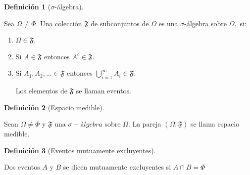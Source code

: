 \documentclass[
  us-letterpaper,
]{scrreprt}
\theoremstyle{definition}
\newtheorem{definition}{Definición}[chapter]
\theoremstyle{plain}
\theoremstyle{plain}
\theoremstyle{remark}
\begin{document}
\begin{definition}[\(\sigma\)-álgebra]\protect\hypertarget{def-sigma_algebra}{}\label{def-sigma_algebra}

Sea \(\Omega \neq \Phi\). Una colección \(\mathfrak{F}\) de subconjuntos
de \(\Omega\) es una \(\sigma\)-álgebra sobre \(\Omega,\) si:

\begin{enumerate}
\def\labelenumi{\roman{enumi}.}
\item
  \(\Omega \in  \mathfrak{F}\).
\item
  Si \(A \in \mathfrak{F}\) entonces \(A^c \in \mathfrak{F}\).
\item
  Si \(A_1, A_2, ... \in \mathfrak{F}\) entonces
  \(\bigcup_{i=1}^{\infty} A_i \in \mathfrak{F}\).

  Los elementos de \(\mathfrak{F}\) se llaman eventos.
\end{enumerate}

\end{definition}

\begin{definition}[Espacio
medible]\protect\hypertarget{def-espacio_medible}{}\label{def-espacio_medible}

Sean \(\Omega \neq \Phi\) y \(\mathfrak{F}\) una \(\sigma- álgebra\)
sobre \(\Omega\). La pareja \((\Omega, \mathfrak{F})\) se llama espacio
medible.

\end{definition}

\begin{definition}[Eventos mutuamente
excluyentes]\protect\hypertarget{def-mutuamente_excluyentes}{}\label{def-mutuamente_excluyentes}

Dos eventos \(A\) y \(B\) se dicen mutuamente excluyentes si
\(A \cap B = \Phi\)

\end{definition}
\end{document}
